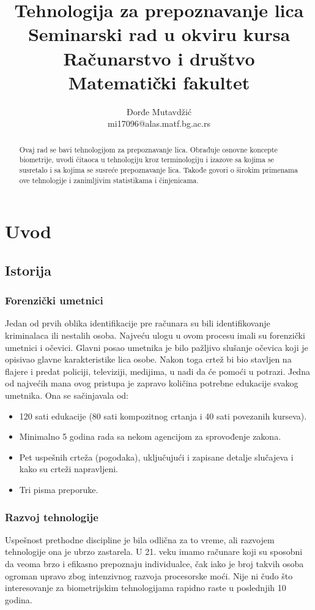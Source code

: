 \documentclass[11pt, a4paper]{article}
\title{Tehnologija za prepoznavanje lica\\\small{Seminarski rad u okviru kursa\\Računarstvo i društvo\\Matematički fakultet}}
\author{Đorđe Mutavdžić\\mi17096@alas.matf.bg.ac.rs}
\begin{document}
\maketitle
\begin{abstract}
    Ovaj rad se bavi tehnologijom za prepoznavanje lica. Obrađuje osnovne koncepte biometrije, uvodi čitaoca u tehnologiju kroz terminologiju i izazove sa kojima se susretalo i sa kojima se susreće prepoznavanje lica. Takođe govori o širokim primenama ove tehnologije i zanimljivim statistikama i činjenicama.
\end{abstract}

\tableofcontents

\newpage

\section{Uvod}

\subsection{Istorija}

\subsubsection{Forenzički umetnici}

Jedan od prvih oblika identifikacije pre računara su bili identifikovanje kriminalaca ili nestalih osoba. Najveću ulogu u ovom procesu imali su forenzički umetnici i očevici. Glavni posao umetnika je bilo pažljivo slušanje očevica koji je opisivao glavne karakteristike lica osobe. Nakon toga crtež bi bio stavljen na flajere i predat policiji, televiziji, medijima, u nadi da će pomoći u potrazi.
Jedna od najvećih mana ovog pristupa je zapravo količina potrebne edukacije svakog umetnika. Ona se sačinjavala od:
\begin{itemize}
    \item 120 sati edukacije (80 sati kompozitnog crtanja i 40 sati povezanih kurseva).
    \item Minimalno 5 godina rada sa nekom agencijom za sprovođenje zakona.
    \item Pet uspešnih crteža (pogodaka), uključujući i zapisane detalje slučajeva i kako su crteži napravljeni.
    \item Tri pisma preporuke.
\end{itemize}

\subsubsection{Razvoj tehnologije}
Uspešnost prethodne discipline je bila odlična za to vreme, ali razvojem tehnologije ona je ubrzo zastarela. U 21. veku imamo računare koji su sposobni da veoma brzo i efikasno prepoznaju individualce, čak iako je broj takvih osoba ogroman upravo zbog intenzivnog razvoja procesorske moći. Nije ni čudo što interesovanje za biometrijskim tehnologijama rapidno raste u poslednjih 10 godina.
\end{document}
